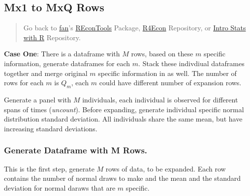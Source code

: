 \documentclass[
]{book}
\begin{document}
\hypertarget{mx1-to-mxq-rows}{%
\subsection{Mx1 to MxQ Rows}\label{mx1-to-mxq-rows}}

\begin{quote}
Go back to \href{http://fanwangecon.github.io/CodeDynaAsset/}{fan}'s \href{https://fanwangecon.github.io/REconTools/}{REconTools} Package, \href{https://fanwangecon.github.io/R4Econ/}{R4Econ} Repository, or \href{https://fanwangecon.github.io/Stat4Econ/}{Intro Stats with R} Repository.
\end{quote}

\textbf{Case One}: There is a dataframe with \(M\) rows, based on these \(m\) specific information, generate dataframes for each \(m\). Stack these indivdiual dataframes together and merge original \(m\) specific information in as well. The number of rows for each \(m\) is \(Q_m\), each \(m\) could have different number of expansion rows.

Generate a panel with \(M\) individuals, each individual is observed for different spans of times (\emph{uncount}). Before expanding, generate individual specific normal distribution standard deviation. All individuals share the same mean, but have increasing standard deviations.

\hypertarget{generate-dataframe-with-m-rows.}{%
\subsubsection{Generate Dataframe with M Rows.}\label{generate-dataframe-with-m-rows.}}

This is the first step, generate \(M\) rows of data, to be expanded. Each row contains the number of normal draws to make and the mean and the standard deviation for normal daraws that are \(m\) specific.
\end{document}
